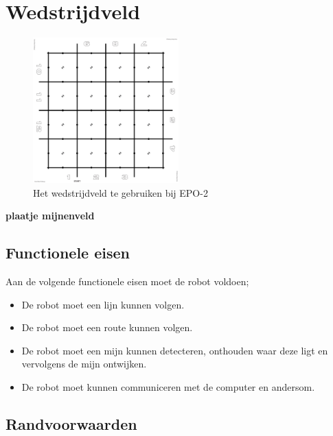 \documentclass{report}
\begin{document}
\section{Wedstrijdveld}
\label{sec:field}

\begin{figure}[H]
	\centering
	\includegraphics[width=0.5\textwidth]{competitionField2440x2440-rc.pdf}
	\caption{Het wedstrijdveld te gebruiken bij EPO-2}
	\label{fig:field}
\end{figure}

\textbf{plaatje mijnenveld}

\subsection{Functionele eisen}

Aan de volgende functionele eisen moet de robot voldoen;

\begin{itemize}

\item
De robot moet een lijn kunnen volgen.


\item 
De robot moet een route kunnen volgen.

\item
De robot moet een mijn kunnen detecteren, onthouden waar deze ligt en vervolgens de mijn ontwijken.

\item 
De robot moet kunnen communiceren met de computer en andersom.

\end{itemize}


\subsection{Randvoorwaarden}
\end{document}
